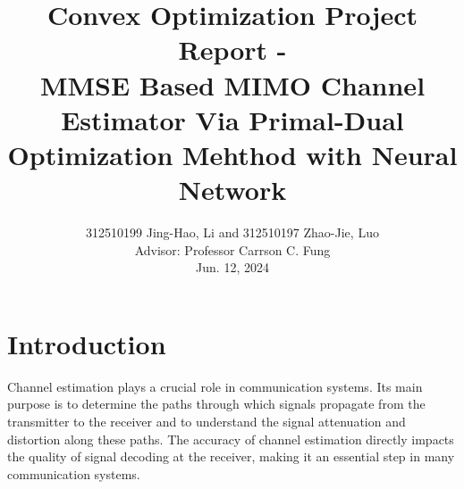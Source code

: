 \documentclass[journal,10pt,twocolumn]{IEEEtran}
\begin{document}


    \title{ Convex Optimization Project Report -\\
    \huge  MMSE Based MIMO Channel Estimator Via Primal-Dual
    Optimization Mehthod with Neural Network}
    \author{312510199 Jing-Hao, Li and 312510197 Zhao-Jie, Luo\\
        Advisor: Professor Carrson C. Fung\\
        \small{Jun. 12, 2024}}


    \maketitle





    \section{Introduction}
        

        Channel estimation plays a crucial role in communication systems. Its main purpose is to determine the paths through which signals propagate from the transmitter 
        to the receiver and to understand the signal attenuation and distortion along these paths. The accuracy of channel estimation directly impacts the quality of 
        signal decoding at the receiver, making it an essential step in many communication systems.
\end{document}
